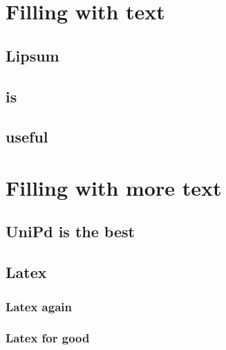 
\chapter{\label{ch:filling}Filling with text}

\lipsum[1-4]

\section{Lipsum}
\lipsum[5-7]

\section{is}
\lipsum[8-10]

\section{useful}
\lipsum[11-14]



\chapter{\label{ch:filling-more}Filling with more text}

\lipsum[15-16]

\section{UniPd is the best}
\lipsum[19-21]

\section{Latex}
\lipsum[28-30]

\subsection{Latex again}
\lipsum[30-31]

\subsection{Latex for good}
\lipsum[32-33]